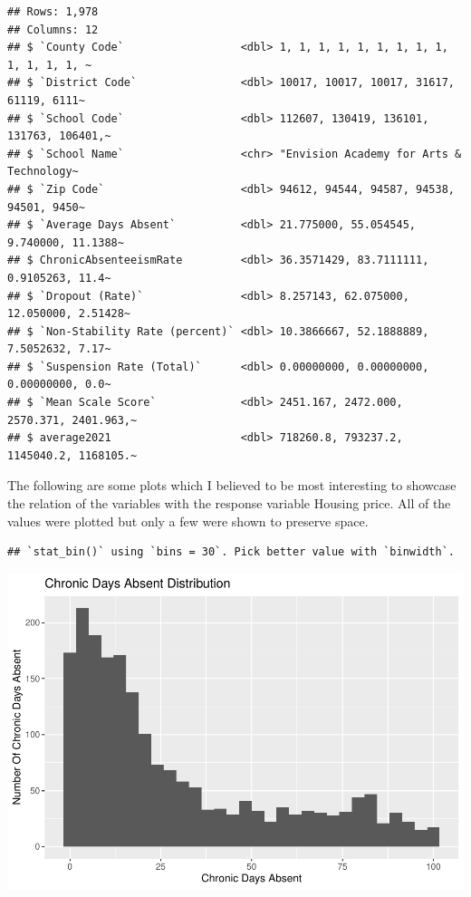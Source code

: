 \documentclass[
]{article}
\begin{document}
\begin{verbatim}
## Rows: 1,978
## Columns: 12
## $ `County Code`                  <dbl> 1, 1, 1, 1, 1, 1, 1, 1, 1, 1, 1, 1, 1, ~
## $ `District Code`                <dbl> 10017, 10017, 10017, 31617, 61119, 6111~
## $ `School Code`                  <dbl> 112607, 130419, 136101, 131763, 106401,~
## $ `School Name`                  <chr> "Envision Academy for Arts & Technology~
## $ `Zip Code`                     <dbl> 94612, 94544, 94587, 94538, 94501, 9450~
## $ `Average Days Absent`          <dbl> 21.775000, 55.054545, 9.740000, 11.1388~
## $ ChronicAbsenteeismRate         <dbl> 36.3571429, 83.7111111, 0.9105263, 11.4~
## $ `Dropout (Rate)`               <dbl> 8.257143, 62.075000, 12.050000, 2.51428~
## $ `Non-Stability Rate (percent)` <dbl> 10.3866667, 52.1888889, 7.5052632, 7.17~
## $ `Suspension Rate (Total)`      <dbl> 0.00000000, 0.00000000, 0.00000000, 0.0~
## $ `Mean Scale Score`             <dbl> 2451.167, 2472.000, 2570.371, 2401.963,~
## $ average2021                    <dbl> 718260.8, 793237.2, 1145040.2, 1168105.~
\end{verbatim}

The following are some plots which I believed to be most interesting to
showcase the relation of the variables with the response variable
Housing price. All of the values were plotted but only a few were shown
to preserve space.

\begin{verbatim}
## `stat_bin()` using `bins = 30`. Pick better value with `binwidth`.
\end{verbatim}

\includegraphics{final-writeup_files/figure-latex/unnamed-chunk-3-1.pdf}
\end{document}
